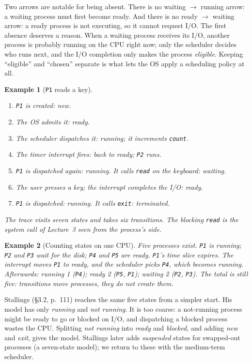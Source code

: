 \documentclass[11pt]{article}
\newtheorem{example}{Example}
\begin{document}
Two arrows are notable for being absent. There is no waiting $\to$ running
arrow: a waiting process must first become ready. And there is no ready $\to$
waiting arrow: a ready process is not executing, so it cannot request I/O. The
first absence deserves a reason. When a waiting process receives its I/O,
another process is probably running on the CPU right now; only the scheduler
decides who runs next, and the I/O completion only makes the process
\emph{eligible}. Keeping ``eligible'' and ``chosen'' separate is what lets the
OS apply a scheduling policy at all.

\begin{example}[\texttt{P1} reads a key]
\begin{enumerate}
  \item \texttt{P1} is created: \emph{new}.
  \item The OS admits it: \emph{ready}.
  \item The scheduler dispatches it: \emph{running}; it increments \texttt{count}.
  \item The timer interrupt fires: back to \emph{ready}; \texttt{P2} runs.
  \item \texttt{P1} is dispatched again: \emph{running}. It calls \texttt{read}
        on the keyboard: \emph{waiting}.
  \item The user presses a key; the interrupt completes the I/O: \emph{ready}.
  \item \texttt{P1} is dispatched: \emph{running}. It calls \texttt{exit}:
        \emph{terminated}.
\end{enumerate}
The trace visits seven states and takes six transitions. The blocking
\texttt{read} is the system call of Lecture~3 seen from the process's side.
\end{example}

\begin{example}[Counting states on one CPU]
Five processes exist. \texttt{P1} is running; \texttt{P2} and \texttt{P3} wait
for the disk; \texttt{P4} and \texttt{P5} are ready. \texttt{P1}'s time slice
expires. The interrupt moves \texttt{P1} to ready, and the scheduler picks
\texttt{P4}, which becomes running. Afterwards: running 1 (\texttt{P4}); ready
2 (\texttt{P5}, \texttt{P1}); waiting 2 (\texttt{P2}, \texttt{P3}). The total
is still five: transitions move processes, they do not create them.
\end{example}

Stallings (\S3.2, p.~111) reaches the same five states from a simpler start.
His  model has only \emph{running} and \emph{not running}. It is
too coarse: a not-running process might be ready to go or blocked on I/O, and
dispatching a blocked process wastes the CPU. Splitting \emph{not running} into
\emph{ready} and \emph{blocked}, and adding \emph{new} and \emph{exit}, gives
the  model. Stallings later adds \emph{suspended} states for
swapped-out processes (a seven-state model); we return to these with the
medium-term scheduler.
\end{document}
